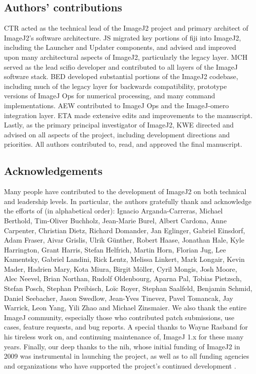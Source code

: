 \documentclass{bmcart}
\begin{document}
\begin{backmatter}
\subsection*{Authors' contributions}
  CTR acted as the technical lead of the ImageJ2 project and primary architect
  of ImageJ2's software architecture. JS migrated key portions of
  \acrshort{fiji} into ImageJ2, including the Launcher and Updater components,
  and advised and improved upon many architectural aspects of ImageJ2,
  particularly the legacy layer. MCH served as the lead \acrshort{scifio}
  developer and contributed to all layers of the ImageJ software stack. BED
  developed substantial portions of the ImageJ2 codebase, including much of the
  legacy layer for backwards compatibility, prototype versions of ImageJ Ops
  for numerical processing, and many command implementations. AEW contributed
  to ImageJ Ops and the ImageJ-\acrshort{omero} integration layer. ETA made
  extensive edits and improvements to the manuscript. Lastly, as the primary
  principal investigator of ImageJ2, KWE directed and advised on all aspects of
  the project, including development directions and priorities. All authors
  contributed to, read, and approved the final manuscript.

\subsection*{Acknowledgements}
  Many people have contributed to the development of ImageJ2 on both technical
  and leadership levels. In particular, the authors gratefully thank and
  acknowledge the efforts of (in alphabetical order): Ignacio Arganda-Carreras,
  Michael Berthold, Tim-Oliver Buchholz, Jean-Marie Burel, Albert Cardona, Anne
  Carpenter, Christian Dietz, Richard Domander, Jan Eglinger, Gabriel Einsdorf,
  Adam Fraser, Aivar Grislis, Ulrik Günther, Robert Haase, Jonathan Hale, Kyle
  Harrington, Grant Harris, Stefan Helfrich, Martin Horn, Florian Jug, Lee
  Kamentsky, Gabriel Landini, Rick Lentz, Melissa Linkert, Mark Longair, Kevin
  Mader, Hadrien Mary, Kota Miura, Birgit Möller, Cyril Mongis, Josh Moore,
  Alec Neevel, Brian Northan, Rudolf Oldenbourg, Aparna Pal, Tobias Pietzsch,
  Stefan Posch, Stephan Preibisch, Loïc Royer, Stephan Saalfeld, Benjamin
  Schmid, Daniel Seebacher, Jason Swedlow, Jean-Yves Tinevez, Pavel Tomancak,
  Jay Warrick, Leon Yang, Yili Zhao and Michael Zinsmaier. We also thank the
  entire ImageJ community, especially those who contributed patch submissions,
  use cases, feature requests, and bug reports. A special thanks to Wayne
  Rasband for his tireless work on, and continuing maintenance of, ImageJ 1.x
  for these many years. Finally, our deep thanks to the \acrshort{nih}, whose
  initial funding of ImageJ2 in 2009 was instrumental in launching the project,
  as well as to all funding agencies and organizations who have supported the
  project's continued development \cite{imagej_funding}.


\end{backmatter}
\end{document}

